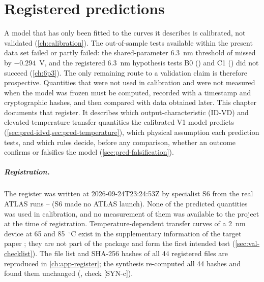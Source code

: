 \chapter{Registered predictions}\label{ch:predictions}

A model that has only been fitted to the curves it describes is calibrated, not validated (\cref{ch:calibration}). The out-of-sample tests available within the present data set failed or partly failed: the shared-parameter 6.3~nm threshold of  missed by $-0.294$~V, and the registered 6.3~nm hypothesis tests B0 () and C1 () did not succeed (\cref{ch:6p3}). The only remaining route to a validation claim is therefore prospective. Quantities that were not used in calibration and were not measured when the model was frozen must be computed, recorded with a timestamp and cryptographic hashes, and then compared with data obtained later. This chapter documents that register. It describes which output-characteristic (ID-VD) and elevated-temperature transfer quantities the calibrated V1 model predicts (\cref{sec:pred-idvd,sec:pred-temperature}), which physical assumption each prediction tests, and which rules decide, before any comparison, whether an outcome confirms or falsifies the model (\cref{sec:pred-falsification}).

\paragraph{Registration.} The register  was written at 2026-09-24T23:24:53Z by specialist S6 from the real ATLAS runs -- (S6 made no ATLAS launch). None of the predicted quantities was used in calibration, and no measurement of them was available to the project at the time of registration. Temperature-dependent transfer curves of a 2~nm device at 65 and 85~$^{\circ}$C exist in the supplementary information of the target paper \citep[SI Fig.~S12, referred to on p.~9 and captioned on p.~11]{Januar2026}; they are not part of the package and form the first intended test (\cref{sec:val-checklist}). The file list and SHA-256 hashes of all 44 registered files are reproduced in \cref{ch:app-register}; the synthesis re-computed all 44 hashes and found them unchanged (, check [SYN-c]).

